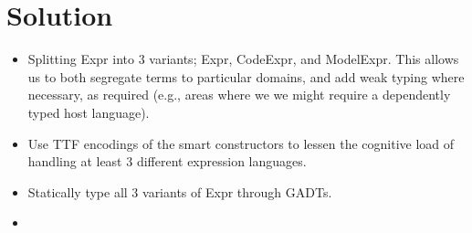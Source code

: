\section{Solution}

\begin{itemize}
    
    \item Splitting Expr into 3 variants; Expr, CodeExpr, and ModelExpr.
          This allows us to both segregate terms to particular domains, and
          add weak typing where necessary, as required (e.g., areas where we
          we might require a dependently typed host language).
    
    \item Use TTF encodings of the smart constructors to lessen the cognitive load
          of handling at least 3 different expression languages.

    \item Statically type all 3 variants of Expr through GADTs.

    \item {}

\end{itemize}



